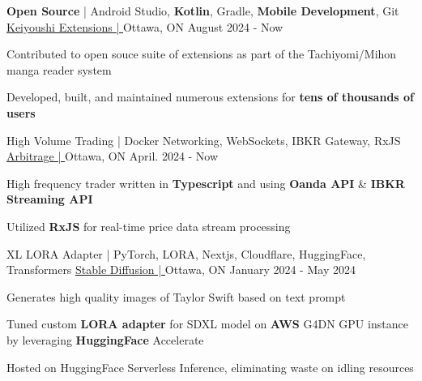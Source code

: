 \begin{cventries}
	\cventry
	{\textbf{Open Source} | Android Studio, \textbf{Kotlin}, Gradle, \textbf{Mobile Development}, Git}
	{\underline{\href{https://github.com/keiyoushi/extensions-source}{Keiyoushi Extensions | \ExternalLink}}}
	{Ottawa, ON} %
	{August 2024 - Now} %
	{
		\begin{cvitems} %
			\item {Contributed to open souce suite of extensions as part of the Tachiyomi/Mihon manga reader system}
      \item {Developed, built, and maintained numerous extensions for \textbf{tens of thousands of users}}
		\end{cvitems}
	}

	\cventry
	{High Volume Trading | Docker Networking, WebSockets, IBKR Gateway, RxJS}
	{\underline{\href{https://github.com/LefanHu/OARB}{Arbitrage | \ExternalLink}}} %
	{Ottawa, ON} %
	{April. 2024 - Now} %
	{
		\begin{cvitems} %
			\item {High frequency trader written in \textbf{Typescript} and using \textbf{Oanda API} \& \textbf{IBKR Streaming API}}
			\item {Utilized \textbf{RxJS} for real-time price data stream processing}
		\end{cvitems}
	}

	\cventry
	{XL LORA Adapter | PyTorch, LORA, Nextjs, Cloudflare, HuggingFace, Transformers}
	{\underline{\href{https://lefan.ca/projects/stable-diffusion}{Stable Diffusion | \ExternalLink}}} %
	{Ottawa, ON} %
	{January 2024 - May 2024} %
	{
		\begin{cvitems} %
			\item {Generates high quality images of Taylor Swift based on text prompt}
			\item {Tuned custom \textbf{LORA adapter} for SDXL model on \textbf{AWS} G4DN GPU instance by leveraging \textbf{HuggingFace} Accelerate}
			\item {Hosted on HuggingFace Serverless Inference, eliminating waste on idling resources}
		\end{cvitems}
	}


\end{cventries}
